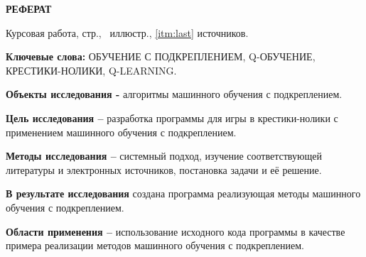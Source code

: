 \begin{center}
  \large\bfseries{РЕФЕРАТ}
\end{center}

Курсовая работа, \pageref{LastPage} стр., \totalfigures\ иллюстр., \ref{itm:last} источников.


\textbf{Ключевые слова:} ОБУЧЕНИЕ С ПОДКРЕПЛЕНИЕМ, \mbox{Q-ОБУЧЕНИЕ}, КРЕСТИКИ-НОЛИКИ, Q-LEARNING.

\textbf{Объекты исследования -} алгоритмы машинного обучения с подкреплением.

\textbf{Цель исследования --} разработка программы для игры в крестики-нолики с применением машинного обучения с подкреплением.

\textbf{Методы исследования --} системный подход, изучение соответствующей литературы и электронных источников, постановка задачи и её решение.

\textbf{В результате исследования} создана программа реализующая методы машинного обучения с подкреплением.

\textbf{Области применения --} использование исходного кода программы в качестве примера реализации методов машинного обучения с подкреплением.









